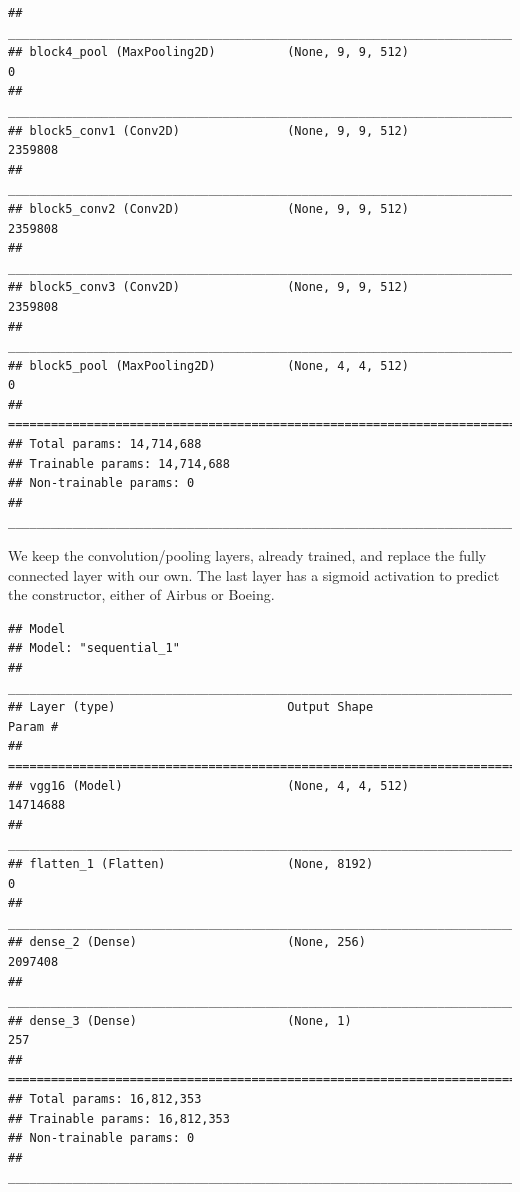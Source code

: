 \documentclass[]{book}
\begin{document}
\begin{verbatim}
## ________________________________________________________________________________
## block4_pool (MaxPooling2D)          (None, 9, 9, 512)               0           
## ________________________________________________________________________________
## block5_conv1 (Conv2D)               (None, 9, 9, 512)               2359808     
## ________________________________________________________________________________
## block5_conv2 (Conv2D)               (None, 9, 9, 512)               2359808     
## ________________________________________________________________________________
## block5_conv3 (Conv2D)               (None, 9, 9, 512)               2359808     
## ________________________________________________________________________________
## block5_pool (MaxPooling2D)          (None, 4, 4, 512)               0           
## ================================================================================
## Total params: 14,714,688
## Trainable params: 14,714,688
## Non-trainable params: 0
## ________________________________________________________________________________
\end{verbatim}

We keep the convolution/pooling layers, already trained, and replace the fully connected layer with our own.
The last layer has a sigmoid activation to predict the constructor, either of Airbus or Boeing.

\begin{verbatim}
## Model
## Model: "sequential_1"
## ________________________________________________________________________________
## Layer (type)                        Output Shape                    Param #     
## ================================================================================
## vgg16 (Model)                       (None, 4, 4, 512)               14714688    
## ________________________________________________________________________________
## flatten_1 (Flatten)                 (None, 8192)                    0           
## ________________________________________________________________________________
## dense_2 (Dense)                     (None, 256)                     2097408     
## ________________________________________________________________________________
## dense_3 (Dense)                     (None, 1)                       257         
## ================================================================================
## Total params: 16,812,353
## Trainable params: 16,812,353
## Non-trainable params: 0
## ________________________________________________________________________________
\end{verbatim}
\end{document}
